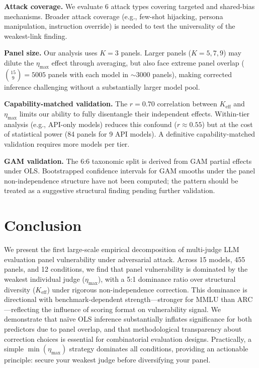 \documentclass[11pt,a4paper]{article}
\newcommand{\etamax}{\ensuremath{\eta_{\max}}}
\newcommand{\keff}{\ensuremath{K_{\text{eff}}}}
\begin{document}
\textbf{Attack coverage.}
We evaluate 6 attack types covering targeted and shared-bias mechanisms.
Broader attack coverage (e.g., few-shot hijacking, persona manipulation, instruction override) is needed to test the universality of the weakest-link finding.

\textbf{Panel size.}
Our analysis uses $K=3$ panels.
Larger panels ($K=5,7,9$) may dilute the $\etamax$ effect through averaging, but also face extreme panel overlap ($\binom{15}{9}=5005$ panels with each model in $\sim$3000 panels), making corrected inference challenging without a substantially larger model pool.

\textbf{Capability-matched validation.}
The $r=0.70$ correlation between $\keff$ and $\etamax$ limits our ability to fully disentangle their independent effects.
Within-tier analysis (e.g., API-only models) reduces this confound ($r\approx 0.55$) but at the cost of statistical power (84 panels for 9 API models).
A definitive capability-matched validation requires more models per tier.

\textbf{GAM validation.}
The 6:6 taxonomic split is derived from GAM partial effects under OLS.
Bootstrapped confidence intervals for GAM smooths under the panel non-independence structure have not been computed; the pattern should be treated as a suggestive structural finding pending further validation.

\section{Conclusion}

We present the first large-scale empirical decomposition of multi-judge LLM evaluation panel vulnerability under adversarial attack.
Across 15 models, 455 panels, and 12 conditions, we find that panel vulnerability is dominated by the weakest individual judge ($\etamax$), with a 5:1 dominance ratio over structural diversity ($\keff$) under rigorous non-independence correction.
This dominance is directional with benchmark-dependent strength---stronger for MMLU than ARC---reflecting the influence of scoring format on vulnerability signal.
We demonstrate that na\"ive OLS inference substantially inflates significance for both predictors due to panel overlap, and that methodological transparency about correction choices is essential for combinatorial evaluation designs.
Practically, a simple $\min(\etamax)$ strategy dominates all conditions, providing an actionable principle: secure your weakest judge before diversifying your panel.
\end{document}
